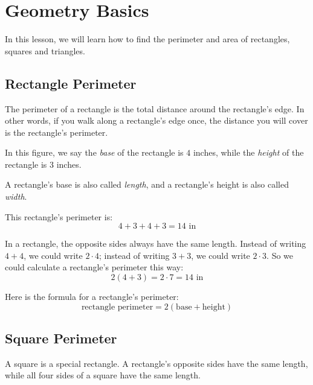 
\section{Geometry Basics}

In this lesson, we will learn how to find the perimeter and area of rectangles, squares and triangles.

\subsection{Rectangle Perimeter}
The perimeter of a rectangle is the total distance around the rectangle's edge. In other words, if you walk along a rectangle's edge once, the distance you will cover is the rectangle's perimeter.

\begin{center}
\label{fig: recPerimeter}
\end{center}

In this figure, we say the \textit{base} of the rectangle is $4$ inches, while the \textit{height} of the rectangle is $3$ inches.

A rectangle's base is also called \textit{length}, and a rectangle's height is also called \textit{width}.

This rectangle's perimeter is:
\[ 4+3+4+3 = 14 \text{ in} \]

In a rectangle, the opposite sides always have the same length. Instead of writing $4+4$, we could write $2\cdot4$; instead of writing $3+3$, we could write $2\cdot3$. So we could calculate a rectangle's perimeter this way:
\[ 2(4+3)=2\cdot7=14 \text{ in} \]

Here is the formula for a rectangle's perimeter:
\[ \text{rectangle perimeter} = 2(\text{base}+\text{height}) \]

\subsection{Square Perimeter}
A square is a special rectangle. A rectangle's opposite sides have the same length, while all four sides of a square have the same length.

